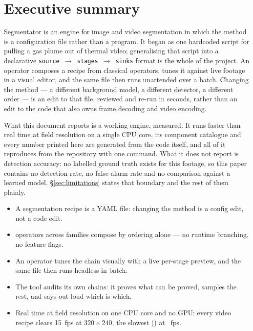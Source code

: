 \section{Executive summary}

Segmentator is an engine for image and video segmentation in which the method is
a configuration file rather than a program. It began as one hardcoded script for
pulling a gas plume out of thermal video; generalising that script into a
declarative \texttt{source $\rightarrow$ stages $\rightarrow$ sinks} format is
the whole of the project. An operator composes a recipe from \NumStages{}
classical operators, tunes it against live footage in a visual editor, and the
same file then runs unattended over a batch. Changing the method --- a different
background model, a different detector, a different order --- is an edit to that
file, reviewed and re-run in seconds, rather than an edit to the code that also
owns frame decoding and video encoding.

What this document reports is a working engine, measured. It runs faster than
real time at field resolution on a single CPU core, its component catalogue and
every number printed here are generated from the code itself, and all of it
reproduces from the repository with one command. What it does not report is
detection accuracy: no labelled ground truth exists for this footage, so this
paper contains no detection rate, no false-alarm rate and no comparison against a
learned model. §\ref{sec:limitations} states that boundary and the rest of them
plainly.

\begin{itemize}
  \item A segmentation recipe is a YAML file: changing the method is a config
        edit, not a code edit.
  \item \NumStages{} operators across \NumFamilies{} families compose by ordering
        alone --- no runtime branching, no feature flags.
  \item An operator tunes the chain visually with a live per-stage preview, and
        the same file then runs headless in batch.
  \item The tool audits its own chains: it proves what can be proved, samples the
        rest, and says out loud which is which.
  \item Real time at field resolution on one CPU core and no GPU: every video
        recipe clears 15~fps at $320\times240$, the slowest
        (\texttt{\BenchSlowestVideo}) at \BenchSlowestVideoFps~fps.
\end{itemize}
